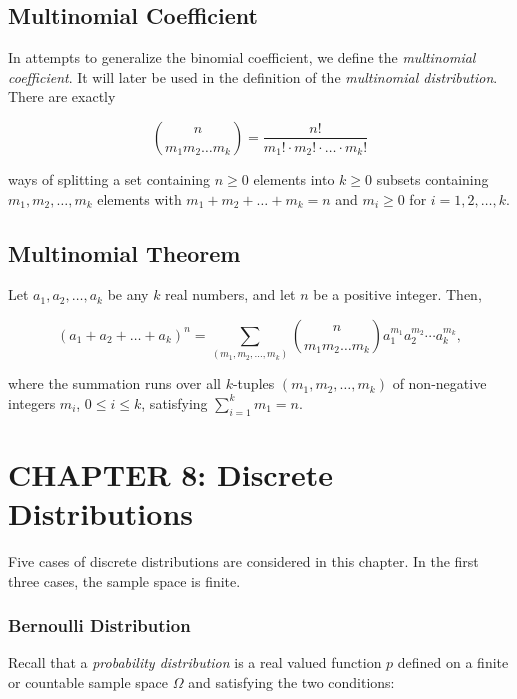 \documentclass[12pt]{article}
\begin{document}
\subsection*{Multinomial Coefficient}
\noindent
In attempts to generalize the binomial coefficient, we define the \textit{multinomial coefficient}. It will later be used in the definition of the \textit{multinomial distribution}. There are exactly

\begin{equation*}
{n \choose m_1 m_2 \ldots m_k} = \frac{n!}{m_1! \cdot m_2! \cdot \ldots \cdot m_k!}
\end{equation*}

\noindent
ways of splitting a set containing $n \geq 0$ elements into $k \geq 0$ subsets containing $m_1, m_2, \ldots, m_k$ elements with $m_1 + m_2 + \ldots + m_k = n$ and $m_i \geq 0$ for $i = 1, 2, \ldots, k$.

\subsection*{Multinomial Theorem}
\noindent
\noindent
Let $a_1, a_2, \ldots, a_k$ be any $k$ real numbers, and let $n$ be a positive integer. Then,

\begin{equation*}
(a_1 + a_2 + \ldots + a_k)^n = \sum_{(m_1, m_2, \ldots, m_k)} {n \choose m_1 m_2 \ldots m_k} a_1^{m_1} a_2^{m_2} \cdots a_k^{m_k},
\end{equation*}

\noindent
where the summation runs over all $k$-tuples $(m_1, m_2, \ldots, m_k)$ of non-negative integers $m_i$, $0 \leq i \leq k$, satisfying $\sum_{i=1}^{k} m_1 = n$.

\section*{CHAPTER 8: Discrete Distributions}
Five cases of discrete distributions are considered in this chapter. In the first three cases, the sample space is finite. 

\subsubsection*{Bernoulli Distribution}
\noindent
Recall that a \textit{probability distribution} is a real valued function $p$ defined on a finite or countable sample space $\Omega$ and satisfying the two conditions:
\end{document}
